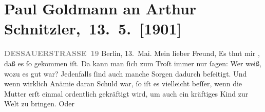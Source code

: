 

         
         \renewcommand{\erwaehntePersonen}{Personen: Paul Goldmann, Robert Hirschfeld, Karl Felix Kohler, Olga Schnitzler, Heinrich Schnitzler, Louise Schnitzler}
         \renewcommand{\erwaehnteInstitutionen}{Institutionen: Neue Freie Presse}
         \renewcommand{\erwaehnteOrte}{Orte: Berlin, Dessauer Straße, Klosters Dorf, Pörtschach, Schweiz, Velden am Wörthersee, Wien, Wörthersee}
         \renewcommand{\erwaehnteWerke}{}
               \section[ Paul Goldmann an Arthur Schnitzler, 13. 5. {[}1901{]}]{ Paul Goldmann an Arthur Schnitzler, 13. 5. {[}1901{]}}\nopagebreak{}\rehead{ }\begin{ledgroupsized}[t]{13cm}\normalsize\beginnumbering{} \toendnotes[C]{\smallbreak\pagebreak[2]} 
\toendnotes[C]{\smallbreak}\pstart
           \noindent{}\raggedleft{}{\pb}\textcolor{gray}{\textbf{DESSAUERSTRASSE 19}}\pend
           \pstart
           Berlin, 13. Mai.\pend
           \pstart\center{}Mein lieber Freund,\pend\pstart
           Es thut mir \label{K_L03066-1v}\label{K_L03066-1h}, daß es ſo gekommen
               iſt. Da kann man ſich zum Troſt immer nur ſagen: Wer weiß, wozu es gut war?
               Jedenfalls ſind auch manche Sorgen dadurch beſeitigt. Und wenn wirklich Anämie daran
               Schuld war, ſo iſt es vielleicht beſſer, wenn die Mutter erſt einmal ordentlich gekräftigt wird, um {\pb}auch ein kräftiges Kind zur Welt zu bringen. Oder

\end{ledgroupsized}
